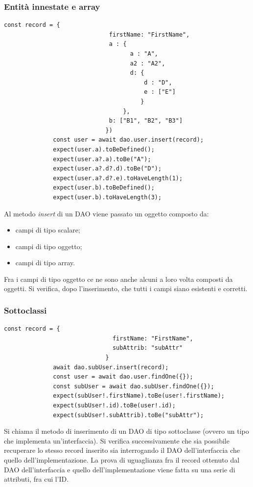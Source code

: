 \documentclass[a4paper, 12pt]{report}
\begin{document}
          \subsubsection{Entità innestate e array}
            \begin{Verbatim}[samepage=true]
              const record = {
                              firstName: "FirstName",
                              a : { 
                                    a : "A",
                                    a2 : "A2",
                                    d: { 
                                        d : "D",
                                        e : ["E"]
                                       }
                                  },
                              b: ["B1", "B2", "B3"]
                             })
              const user = await dao.user.insert(record);
              expect(user.a).toBeDefined();
              expect(user.a?.a).toBe("A");
              expect(user.a?.d?.d).toBe("D");
              expect(user.a?.d?.e).toHaveLength(1);
              expect(user.b).toBeDefined();
              expect(user.b).toHaveLength(3);
            \end{Verbatim}
            Al metodo \emph{insert} di un DAO viene passato un oggetto composto da:
            \begin{itemize}
              \item campi di tipo scalare;
              \item campi di tipo oggetto;
              \item campi di tipo array.
            \end{itemize}
            Fra i campi di tipo oggetto ce ne sono anche alcuni a loro volta composti da oggetti.
            Si verifica, dopo l'inserimento, che tutti i campi siano esistenti e corretti.
          \subsubsection{Sottoclassi}
            \begin{Verbatim}[samepage=true]
              const record = { 
                               firstName: "FirstName",
                               subAttrib: "subAttr"
                             }
              await dao.subUser.insert(record);
              const user = await dao.user.findOne({});
              const subUser = await dao.subUser.findOne({});
              expect(subUser!.firstName).toBe(user!.firstName);
              expect(subUser!.id).toBe(user!.id);
              expect(subUser!.subAttrib).toBe("subAttr");
            \end{Verbatim}
            Si chiama il metodo di inserimento di un DAO di tipo sottoclasse (ovvero un tipo che implementa un'interfaccia). Si verifica successivamente che sia possibile recuperare lo stesso record inserito sia interrogando il DAO dell'interfaccia che quello dell'implementazione. La prova di uguaglianza fra il record ottenuto dal DAO
            dell'interfaccia e quello dell'implementazione viene fatta su una serie di attributi, fra cui l'ID.
\end{document}
